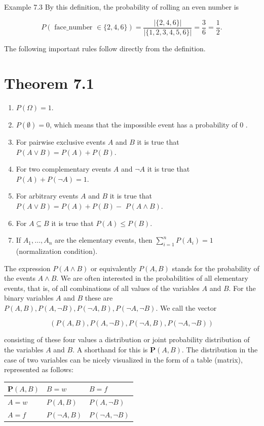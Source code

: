 \documentclass[10pt]{book}
\begin{document}
\begin{center}
\begin{enumerate}
Example 7.3 By this definition, the probability of rolling an even number is

$$
P(\text { face_number } \in\{2,4,6\})=\frac{|\{2,4,6\}|}{|\{1,2,3,4,5,6\}|}=\frac{3}{6}=\frac{1}{2} .
$$

The following important rules follow directly from the definition.

\section*{Theorem 7.1}
\begin{enumerate}
  \item $P(\Omega)=1$.
  \item $P(\emptyset)=0$, which means that the impossible event has a probability of 0 .
  \item For pairwise exclusive events $A$ and $B$ it is true that $P(A \vee B)=P(A)+P(B)$.
  \item For two complementary events $A$ and $\neg A$ it is true that $P(A)+P(\neg A)=1$.
  \item For arbitrary events $A$ and $B$ it is true that $P(A \vee B)=P(A)+P(B)-$ $P(A \wedge B)$.
  \item For $A \subseteq B$ it is true that $P(A) \leq P(B)$.
  \item If $A_{1}, \ldots, A_{n}$ are the elementary events, then $\sum_{i=1}^{n} P\left(A_{i}\right)=1$ (normalization condition).
\end{enumerate}

The expression $P(A \wedge B)$ or equivalently $P(A, B)$ stands for the probability of the events $A \wedge B$. We are often interested in the probabilities of all elementary events, that is, of all combinations of all values of the variables $A$ and $B$. For the binary variables $A$ and $B$ these are $P(A, B), P(A, \neg B), P(\neg A, B), P(\neg A, \neg B)$. We call the vector

$$
(P(A, B), P(A, \neg B), P(\neg A, B), P(\neg A, \neg B))
$$

consisting of these four values a distribution or joint probability distribution of the variables $A$ and $B$. A shorthand for this is $\boldsymbol{P}(A, B)$. The distribution in the case of two variables can be nicely visualized in the form of a table (matrix), represented as follows:

\begin{center}
\begin{tabular}{lll}
\hline
$\boldsymbol{P}(A, B)$ & $B=w$ & $B=f$ \\
\hline
$A=w$ & $P(A, B)$ & $P(A, \neg B)$ \\
\hline
$A=f$ & $P(\neg A, B)$ & $P(\neg A, \neg B)$ \\
\hline
\end{tabular}
\end{center}


\end{enumerate}
\end{center}
\end{document}

